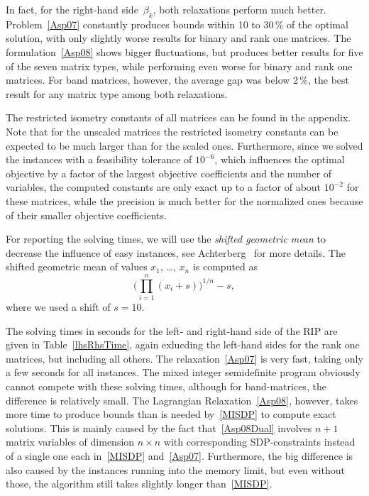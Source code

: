 \documentclass[journal]{IEEEtran}
\begin{document}


In fact, for the right-hand side~$\beta_k$,  both relaxations
perform much better. Problem~\eqref{Asp07} constantly produces bounds within 10 to 30\,\% of the optimal
solution, with only slightly worse results for binary and rank one matrices. The formulation~\eqref{Asp08}
shows bigger fluctuations, but produces better results for five of the seven matrix types, while performing even
worse for binary and rank one matrices. For band matrices, however, the average gap was below 2\,\%, the best 
result for any matrix type among both relaxations.

\color{red}The restricted isometry constants of all matrices can be found in the appendix. Note that for the unscaled matrices
the restricted isometry constants can be expected to be much larger than for the scaled ones. Furthermore, since we solved
the instances with a feasibility tolerance of $10^{-6}$, which influences the optimal objective by a factor of the
largest objective coefficients and the number of variables, the computed constants are only exact up to a factor
of about $10^{-2}$ for these matrices, while the precision is much better for the normalized ones because of their
smaller objective coefficients.\color{black}

For reporting the solving times, we will use the \emph{shifted
  geometric mean} to decrease the influence of easy instances, see
Achterberg~\cite{SCIP} for more details. The shifted geometric
mean of values $x_1$, \dots, $x_n$ is computed as
\begin{equation*}
  \Big( \prod_{i=1}^n (x_i + s)\Big)^{1/n} - s,
\end{equation*}
where we used a shift of $s=10$.

The solving times in seconds for the left- and right-hand side of the RIP are given in
Table~\ref{lhsRhsTime}, again exlucding the left-hand sides for the rank one matrices,
but including all others. The relaxation~\eqref{Asp07}
is very fast, taking only a few seconds for all instances. The mixed integer semidefinite program obviously
cannot compete with these solving times, although for band-matrices, the difference is relatively
small. The Lagrangian Relaxation~\eqref{Asp08}, however, takes more time to produce bounds than is needed
by~\eqref{MISDP} to compute exact solutions. This is mainly caused by the fact that~\eqref{Asp08Dual} involves
$n+1$ matrix variables of dimension $n\times n$ with corresponding SDP-constraints instead of a 
single one each in~\eqref{MISDP} and~\eqref{Asp07}.
Furthermore, the big difference is also caused by the instances running into the 
memory limit, but even without those, the algorithm still takes slightly longer than~\eqref{MISDP}.
\end{document}

